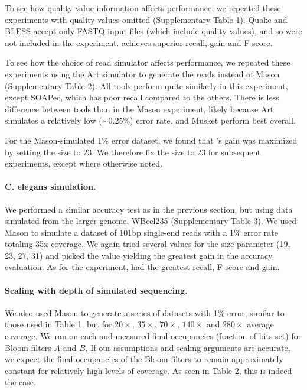 \documentclass{bmcart}
\begin{document}
To see how quality value information affects performance, we repeated these experiments with quality values omitted (Supplementary Table 1).
Quake and BLESS accept only FASTQ input files (which include quality values), and so were not included in the experiment.
\tool achieves superior recall, gain and F-score.

To see how the choice of read simulator affects performance, we repeated these experiments using the Art \cite{huang2012art} simulator to generate the reads instead of Mason (Supplementary Table 2).
All tools perform quite similarly in this experiment, except SOAPec, which has poor recall compared to the others.
There is less difference between tools than in the Mason experiment, likely because Art simulates a relatively low ($\sim$0.25\%) error rate.
\tool and Musket perform best overall.

For the Mason-simulated 1\% error dataset, we found that \tool's gain was maximized by setting the \kmer size to 23.  We therefore fix the \kmer size to 23 for subsequent experiments, except where otherwise noted.

\paragraph{C. elegans simulation.}
We performed a similar accuracy test as in the previous section, but using data simulated from the larger \elegans genome, WBcel235 (Supplementary Table 3).  We used Mason to simulate a dataset of 101bp single-end reads with a 1\% error rate totaling 35x coverage.  We again tried several values for the \kmer size parameter (19, 23, 27, 31) and picked the value yielding the greatest gain in the accuracy evaluation.  As for the \ecoli experiment, \tool had the greatest recall, F-score and gain.

\paragraph{Scaling with depth of simulated sequencing.} We also used Mason to generate a series of datasets with 1\% error, similar to those used in Table 1, but for $20\times$, $35\times$, $70\times$, $140\times$ and $280\times$ average coverage.  We ran \tool on each and measured final occupancies (fraction of bits set) for Bloom filters $A$ and $B$.  If our assumptions and scaling arguments are accurate, we expect the final occupancies of the Bloom filters to remain approximately constant for relatively high levels of coverage.  As seen in Table 2, this is indeed the case.  
\end{document}
